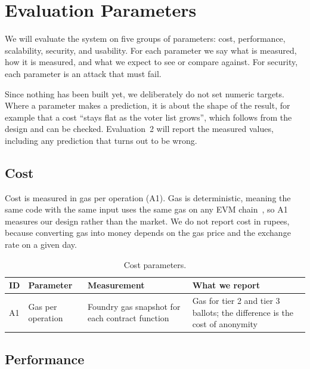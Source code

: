 \section{Evaluation Parameters}

We will evaluate the system on five groups of parameters: cost, performance,
scalability, security, and usability. For each parameter we say what is
measured, how it is measured, and what we expect to see or compare against. For
security, each parameter is an attack that must fail.

Since nothing has been built yet, we deliberately do not set numeric targets.
Where a parameter makes a prediction, it is about the shape of the result, for
example that a cost ``stays flat as the voter list grows'', which follows from
the design and can be checked. Evaluation~2 will report the measured values,
including any prediction that turns out to be wrong.

\subsection{Cost}

Cost is measured in gas per operation (A1). Gas is deterministic, meaning the
same code with the same input uses the same gas on any EVM
chain~\cite{ethgas}, so A1 measures our design rather than the market. We do
not report cost in rupees, because converting gas into money depends on the gas
price and the exchange rate on a given day.

\begin{table}[htbp]
  \centering
  \caption{Cost parameters.}
  \label{tab:eval-cost}
  \small
  \begin{tabular}{@{}lL{4.3cm}L{5.0cm}L{5.0cm}@{}}
    \toprule
    \textbf{ID} & \textbf{Parameter}   & \textbf{Measurement}                       & \textbf{What we report} \\
    \midrule
    A1          & Gas per operation    & Foundry gas snapshot for each contract function~\cite{foundry} & Gas for tier 2 and tier 3 ballots; the difference is the cost of anonymity \\
    \bottomrule
  \end{tabular}
\end{table}

\subsection{Performance}


